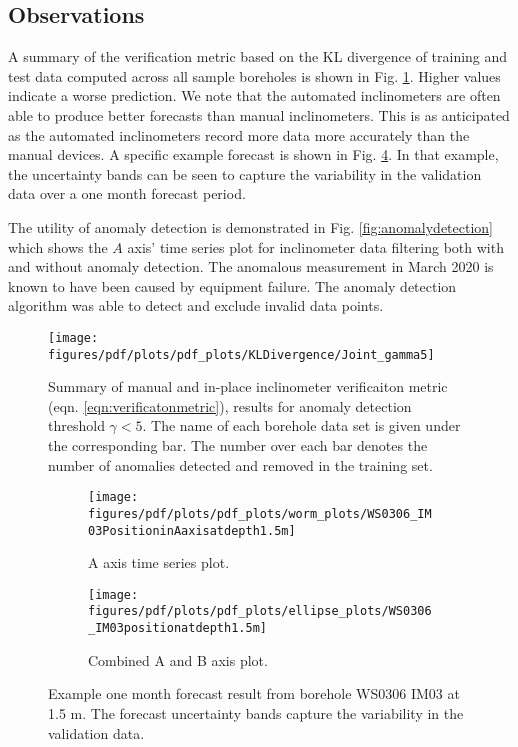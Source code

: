 \documentclass[pamm,a4paper,fleqn]{w-art}
\begin{document}
\subsection{Observations}

A summary of the verification metric based on the KL divergence of training and test data computed across all sample boreholes is shown in Fig. \ref{fig:kldivs}. Higher values indicate a worse prediction. We note that the automated inclinometers are often able to produce better forecasts than manual inclinometers. This is as anticipated as the automated inclinometers record more data more accurately than the manual devices. A specific example forecast is shown in Fig. \ref{fig:exampleborehole}. In that example, the uncertainty bands can be seen to capture the variability in the validation data over a one month forecast period.

The utility of anomaly detection is demonstrated in Fig. \ref{fig:anomalydetection} which shows the $A$ axis' time series plot for inclinometer data filtering both with and without anomaly detection. The anomalous measurement in March 2020 is known to have been caused by equipment failure. The anomaly detection algorithm was able to detect and exclude invalid data points. 


\begin{figure}[b]
  \centering
    \texttt{[image: figures/pdf/plots/pdf\_plots/KLDivergence/Joint\_gamma5]}
  \caption{Summary of manual and in-place inclinometer verificaiton metric (eqn. \ref{eqn:verificatonmetric}), results for anomaly detection threshold $\gamma < 5$.  The name of each borehole data set is given under the corresponding bar. The number over each bar denotes the number of anomalies detected and removed in the training set.}
  \label{fig:kldivs}
\end{figure}


\begin{figure}[b]
  \centering
  \begin{subfigure}{.5\textwidth}
    \centering
    \texttt{[image: figures/pdf/plots/pdf\_plots/worm\_plots/WS0306\_IM03PositioninAaxisatdepth1.5m]}
    \caption{A axis time series plot.}
    \label{fig:sub1}
  \end{subfigure}%
  \begin{subfigure}{.5\textwidth}
    \centering
    \texttt{[image: figures/pdf/plots/pdf\_plots/ellipse\_plots/WS0306\_IM03positionatdepth1.5m]}
    \caption{Combined A and B axis plot.}
    \label{fig:sub2}
  \end{subfigure}
  \caption{Example one month forecast result from borehole WS0306 IM03 at 1.5 m. The forecast uncertainty bands capture the variability in the validation data.}
  \label{fig:exampleborehole}
\end{figure}
  
\end{document}
